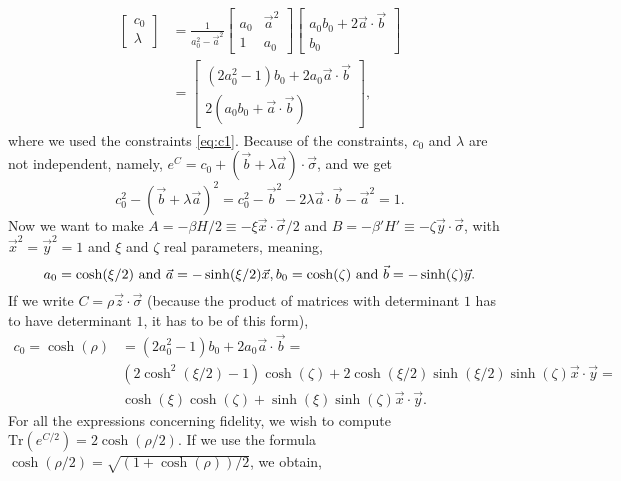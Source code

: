 \begin{eqnarray}
\left[\begin{array}{c}
c_0\\
\lambda	
\end{array}
\right]&=\frac{1}{a_0^2-\vec{a}^2}\left[\begin{array}{cc}
a_0 & \vec{a}^2\\
1 & a_0	
\end{array}\right]\left[\begin{array}{c}
a_0 b_0+2\vec{a}\cdot\vec{b}\\
b_0
\end{array}
\right] \nonumber \\
&=\left[\begin{array}{c}
(2 a_0 ^2-1) b_0+2 a_0\vec{a}\cdot\vec{b}\\
2(a_0 b_0+\vec{a}\cdot\vec{b})
\end{array}
\right],
\end{eqnarray}
where we used the constraints \eqref{eq:c1}. Because of the constraints, $c_0$ and $\lambda$ are not independent, namely,
$e^C=c_0+(\vec{b}+\lambda \vec{a})\cdot\vec{\sigma}$, and we get
\begin{equation}
c_0^2-(\vec{b}+\lambda \vec{a})^2=c_0^2-\vec{b}^2-2\lambda \vec{a}\cdot \vec{b}-\vec{a}^2=1.
\end{equation}
Now we want to make $A=-\beta H/2\equiv-\xi \vec{x}\cdot \vec\sigma/2$ and $B=-\beta 'H'\equiv-\zeta \vec{y}\cdot \vec\sigma$, with $\vec{x}^2=\vec{y}^2=1$ and $\xi$ and $\zeta$ real parameters, meaning,
\begin{equation}
a_0=\cosh(\xi/2) \text{ and } \vec{a}=-\sinh(\xi/2) \vec{x},\\
b_0=\cosh(\zeta) \text{ and } \vec{b}=-\sinh(\zeta) \vec{y}.	
\end{equation}
If we write $C=\rho \vec{z}\cdot \vec \sigma$ (because the product of matrices with determinant $1$ has to have determinant $1$, it has to be of this form),
\begin{eqnarray}
c_0 =\cosh(\rho)& =(2 a_0 ^2-1) b_0+2 a_0\vec{a}\cdot\vec{b}= \nonumber \\
&(2\cosh ^2(\xi/2)-1)\cosh(\zeta)+2\cosh(\xi/2)\sinh(\xi/2)\sinh(\zeta)\vec{x}\cdot\vec{y}= \nonumber \\
&\cosh(\xi)\cosh(\zeta)+\sinh(\xi)\sinh(\zeta)\vec{x}\cdot\vec{y}.
\end{eqnarray}
For all the expressions concerning fidelity, we wish to compute $\text{Tr}(e^{C/2})=2\cosh(\rho/2)$. If we use the formula $\cosh(\rho/2)=\sqrt{(1+\cosh(\rho))/2}$, we obtain,
